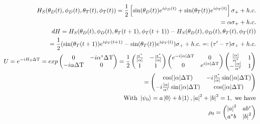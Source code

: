 \begin{align*}
	H_S(\theta_D(t), \phi_D(t), \theta_T(t), \phi_T(t)) = \frac{1}{2} \left[\sin(\theta_D(t)) e^{i\phi_D(t)} + \sin(\theta_T(t)) e^{i\phi_T(t)}\right] \sigma_{+} + h.c. \\
	= \alpha \sigma_{+} + h.c. \\
	dH = H_S(\theta_D(t), \phi_D(t), \theta_T(t+1), \phi_T(t+1)) - H_S(\theta_D(t), \phi_D(t), \theta_T(t), \phi_T(t)) \\
	= \frac{1}{2}(\sin(\theta_T(t+1))e^{i\phi_T(t+1)} - \sin(\theta_T(t))e^{i\phi_T(t)}) \sigma_{+} + h.c. =: (\tau' - \tau) \sigma_{+} + h.c. \\
	U = e^{-iH_S \Delta \mathrm{T}} = 
	exp \begin{pmatrix}
	0 & -i\alpha^* \Delta \mathrm{T} \\
	-i \alpha \Delta \mathrm{T} & 0 \\
	\end{pmatrix} = 
	\frac{1}{2} \begin{pmatrix}
	\frac{\alpha^*}{\abs{\alpha}} & -\frac{\alpha^*}{\abs{\alpha}} \\
	1 & 1 \\
	\end{pmatrix}
	\begin{pmatrix}
	e^{-i\abs{\alpha} \Delta \mathrm{T}} & 0 \\
	0 & e^{i\abs{\alpha} \Delta \mathrm{T}} \\
	\end{pmatrix}
	\begin{pmatrix}
	\frac{\abs{\alpha}}{\alpha^*} & 1 \\
	-\frac{\abs{\alpha}}{\alpha^*} & 1 \\
	\end{pmatrix} \\
	= \begin{pmatrix}
	\cos(\abs{\alpha}\Delta \mathrm{T}) & -i\frac{\alpha^*}{\abs{\alpha}} \sin(\abs{\alpha}\Delta \mathrm{T}) \\
	-i\frac{\abs{\alpha}}{\alpha^*} \sin(\abs{\alpha}\Delta \mathrm{T}) & \cos(\abs{\alpha} \Delta \mathrm{T}) \\
	\end{pmatrix} \\
	\mathrm{With} \ \ket{\psi_0} = a \ket{0} + b \ket{1}, \abs{a}^2 + \abs{b}^2 = 1, \ \mathrm{we \ have} \\
	\rho_0 = \begin{pmatrix}
	\abs{a}^2 & a b ^* \\
	a^* b & \abs{b}^2 \\

\end{pmatrix}
\end{align*}
